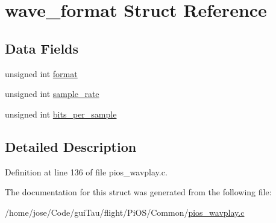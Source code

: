 \hypertarget{structwave__format}{\section{wave\-\_\-format Struct Reference}
\label{structwave__format}
}
\subsection*{Data Fields}
\begin{DoxyCompactItemize}
\item 
unsigned int \hyperlink{group___w_a_v_e_p_l_a_y_e_r___private___variables_ga9d1757773fade2368a9707940f73a817}{format}
\item 
unsigned int \hyperlink{group___w_a_v_e_p_l_a_y_e_r___private___variables_gac4e6a65b9847e9764ced1595404b75fe}{sample\-\_\-rate}
\item 
unsigned int \hyperlink{group___w_a_v_e_p_l_a_y_e_r___private___variables_gad262ae00b4298e98bbbd565de116f390}{bits\-\_\-per\-\_\-sample}
\end{DoxyCompactItemize}


\subsection{Detailed Description}


Definition at line 136 of file pios\-\_\-wavplay.\-c.



The documentation for this struct was generated from the following file\-:\begin{DoxyCompactItemize}
\item 
/home/jose/\-Code/gui\-Tau/flight/\-Pi\-O\-S/\-Common/\hyperlink{pios__wavplay_8c}{pios\-\_\-wavplay.\-c}\end{DoxyCompactItemize}

